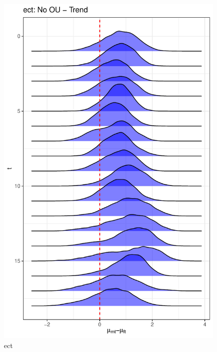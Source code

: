\documentclass[
  12pt,
]{article}
\begin{document}
\begin{figure}

{\centering \includegraphics[width=0.9\linewidth]{../Figures/ect/mu_diff} 

}

\caption{ect}\label{fig:unnamed-chunk-11}
\end{figure}
\end{document}

